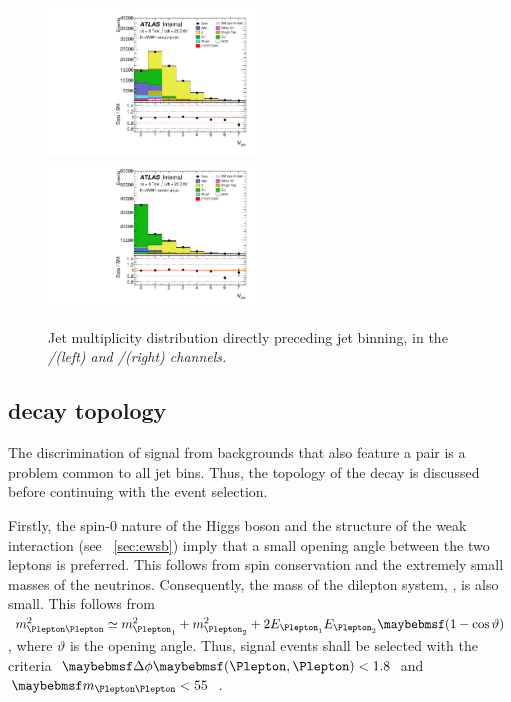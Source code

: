 \begin{figure}
	\includegraphics[width=0.495\textwidth]{tex/selection/emme_CutMETRel_m_jet_n_upTo7_mh125_lin}
	\hfill
	\includegraphics[width=0.495\textwidth]{tex/selection/eemm_CutMETRel_m_jet_n_upTo7_mh125_lin}
	\caption{Jet multiplicity distribution directly preceding jet binning, in the 
	\em/\me (left) and \ee/\mm (right) channels.}
	\label{fig:sel:njets}
\end{figure}



\subsection{\HWWlvlv decay topology}
\label{sec:selection:higgs_decay}

The discrimination of \HWW signal from backgrounds that also feature a \WW pair is a 
problem common to all jet bins. Thus, the topology of the \HWWlvlv decay is discussed 
before continuing with the event selection.

Firstly, the spin-0 nature of the Higgs boson and the \VminusA structure of the weak 
interaction (see \Section~\ref{sec:ewsb}) imply that a small opening angle between the 
two leptons is preferred. This follows from spin conservation and the extremely small 
masses of the neutrinos. Consequently, the mass of the dilepton system, \mll, is also 
small. This follows from $m_{\Plepton\Plepton}^2 \simeq m_{\Plepton_1}^2 + 
m_{\Plepton_2}^2 + 2 E_{\Plepton_1} E_{\Plepton_2} \parenths{1 - \cos\vartheta}$, where 
$\vartheta$ is the opening angle. Thus, signal events shall be selected with the criteria 
$\dphill < 1.8$ and \unit{$\mll < 55$}{\GeV}.

